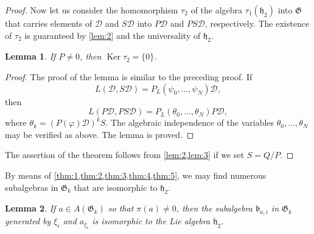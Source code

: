 \documentclass[a4paper]{article}
\newtheorem{lemma}{Lemma}
\newcommand{\Ker}{\operatorname{Ker}}
\begin{document}
\begin{proof}
	Now let us consider the homomorphism $\tau_2$ of the algebra $\tau_1(\mathfrak{h}_2)$ into $\mathfrak{G}$ that carries elements of $\mathscr{D}$ and $S\mathscr{D}$ into $P\mathscr{D}$ and $PS\mathscr{D}$, respectively.
	The existence of $\tau_2$ is guaranteed by \cref{lem:2} and the universality of $\mathfrak{h}_2$.
	
	\begin{lemma}
		\label{lem:3}
		If $P \neq 0$, then $\Ker \tau_2 = \{ 0 \}$.
	\end{lemma}
	
	\begin{proof}
		The proof of the lemma is similar to the preceding proof.
		If
		\begin{equation*}
			L(\mathscr{D},S\mathscr{D}) = P_L(\psi_0,\dotsc,\psi_N) \mathscr{D},
		\end{equation*}
		then
		\begin{equation*}
			L(P\mathscr{D},PS\mathscr{D}) = P_L(\theta_0,\dotsc,\theta_N) P \mathscr{D},
		\end{equation*}
		where $\theta_k = (P(\varphi)\mathscr{D})^k S$.
		The algebraic independence of the variables $\theta_0, \dotsc, \theta_N$ may be verified as above.
		The lemma is proved.
	\end{proof}

	The assertion of the theorem follows from \cref{lem:2,lem:3} if we set $S = Q/P$.	
\end{proof}

By means of \cref{thm:1,thm:2,thm:3,thm:4,thm:5}, we may find numerous subalgebras in $\mathfrak{G}_k$ that are isomorphic to $\mathfrak{h}_2$.

\begin{lemma}
	\label{lem:4}
	If $a \in A(\mathfrak{G}_k)$ so that $\pi(a) \neq 0$, then the subalgebra $\mathfrak{b}_{a,i}$ in $\mathfrak{G}_k$ generated by $\xi_i$ and $a_{\xi_i}$ is isomorphic to the Lie algebra $\mathfrak{h}_2$.
\end{lemma}
\end{document}
